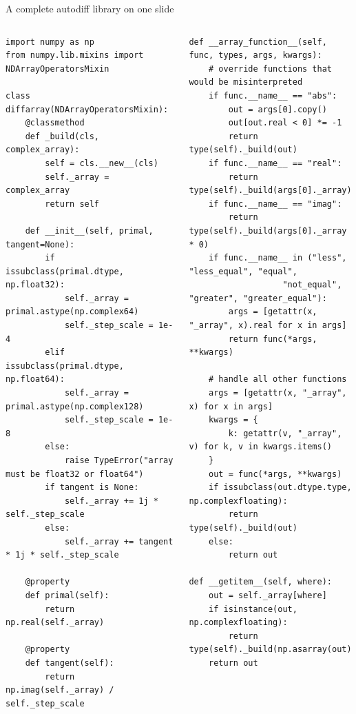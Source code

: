 \documentclass[aspectratio=169]{beamer}
\begin{document}
\begin{frame}[fragile]{A complete autodiff library on one slide}
\vspace{0.1 cm}
\tiny
\begin{columns}
\begin{verbatim}
import numpy as np
from numpy.lib.mixins import NDArrayOperatorsMixin

class diffarray(NDArrayOperatorsMixin):
    @classmethod
    def _build(cls, complex_array):
        self = cls.__new__(cls)
        self._array = complex_array
        return self

    def __init__(self, primal, tangent=None):
        if issubclass(primal.dtype, np.float32):
            self._array = primal.astype(np.complex64)
            self._step_scale = 1e-4
        elif issubclass(primal.dtype, np.float64):
            self._array = primal.astype(np.complex128)
            self._step_scale = 1e-8
        else:
            raise TypeError("array must be float32 or float64")
        if tangent is None:
            self._array += 1j * self._step_scale
        else:
            self._array += tangent * 1j * self._step_scale

    @property
    def primal(self):
        return np.real(self._array)

    @property
    def tangent(self):
        return np.imag(self._array) / self._step_scale
\end{verbatim}

\begin{verbatim}
def __array_function__(self, func, types, args, kwargs):
    # override functions that would be misinterpreted
    if func.__name__ == "abs":
        out = args[0].copy()
        out[out.real < 0] *= -1
        return type(self)._build(out)
    if func.__name__ == "real":
        return type(self)._build(args[0]._array)
    if func.__name__ == "imag":
        return type(self)._build(args[0]._array * 0)
    if func.__name__ in ("less", "less_equal", "equal",
                   "not_equal", "greater", "greater_equal"):
        args = [getattr(x, "_array", x).real for x in args]
        return func(*args, **kwargs)

    # handle all other functions
    args = [getattr(x, "_array", x) for x in args]
    kwargs = {
        k: getattr(v, "_array", v) for k, v in kwargs.items()
    }
    out = func(*args, **kwargs)
    if issubclass(out.dtype.type, np.complexfloating):
        return type(self)._build(out)
    else:
        return out

def __getitem__(self, where):
    out = self._array[where]
    if isinstance(out, np.complexfloating):
        return type(self)._build(np.asarray(out))
    return out
\end{verbatim}
\end{columns}
\end{frame}
\end{document}
